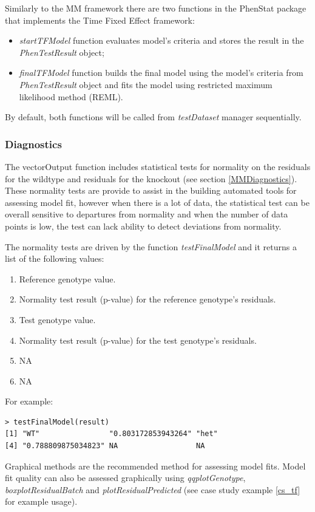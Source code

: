 \documentclass[12pt,a4paper]{article}
\begin{document}
Similarly to the MM framework there are two functions in the PhenStat package that implements the Time Fixed Effect framework:
\begin{itemize}
\item \textit{startTFModel} function evaluates model's criteria and stores the result in the \textit{PhenTestResult} object;
\item \textit{finalTFModel} function builds the final model using the model's criteria from \textit{PhenTestResult} object and fits the model using restricted maximum likelihood method (REML). 
\end{itemize}
By default, both functions will be called from \textit{testDataset} manager sequentially.

\subsubsection{Diagnostics}
The vectorOutput function includes statistical tests for normality on the residuals for the wildtype and residuals for the knockout (see section \ref{MMDiagnostics}). These normality tests are provide to assist in the building automated tools for assessing model fit, however when there is a lot of data, the statistical test can be overall sensitive to departures from normality and when the number of data points is low, the test can lack ability to detect deviations from normality.

The normality tests are driven by the function \textit{testFinalModel} and it returns a list of the following values:
\begin{enumerate}
\item Reference genotype value.
\item Normality test result (p-value) for the reference genotype's residuals.
\item Test genotype value.
\item Normality test result (p-value) for the test genotype's residuals.
\item NA
\item NA
\end{enumerate}

For example:
\begingroup
\fontsize{8pt}{12pt}\selectfont
\begin{verbatim}
> testFinalModel(result)
[1] "WT"                "0.803172853943264" "het"              
[4] "0.788809875034823" NA                  NA                 
\end{verbatim}
\endgroup
Graphical methods are the recommended method for assessing model fits. Model fit quality can also be assessed graphically using \textit{qqplotGenotype},  \textit{boxplotResidualBatch} and  \textit{plotResidualPredicted} (see case study example \ref{cs_tf} for example usage).
\end{document}
